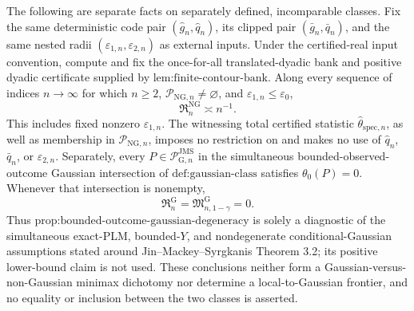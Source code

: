 The following are separate facts on separately defined, incomparable classes. Fix the same deterministic code pair \((\widehat g_n,\widehat q_n)\), its clipped pair \((\bar g_n,\bar q_n)\), and the same nested radii \((\varepsilon_{1,n},\varepsilon_{2,n})\) as external inputs. Under the certified-real input convention, compute and fix the once-for-all translated-dyadic bank and positive dyadic certificate supplied by \(\text{lem:finite-contour-bank}\). Along every sequence of indices \(n\to\infty\) for which \(n\ge2\), \(\mathcal P_{\mathrm{NG},n}\neq\varnothing\), and \(\varepsilon_{1,n}\le\varepsilon_0\),
\[
 \mathfrak R_n^{\mathrm{NG}}\asymp n^{-1}.
\]
This includes fixed nonzero \(\varepsilon_{1,n}\). The witnessing total certified statistic \(\widehat\theta_{\mathrm{spec},n}\), as well as membership in \(\mathcal P_{\mathrm{NG},n}\), imposes no restriction on and makes no use of \(\widehat q_n\), \(\bar q_n\), or \(\varepsilon_{2,n}\). Separately, every \(P\in\mathcal P_{\mathrm G,n}^{\mathrm{JMS}}\) in the simultaneous bounded-observed-outcome Gaussian intersection of \(\text{def:gaussian-class}\) satisfies \(\theta_0(P)=0\). Whenever that intersection is nonempty,
\[
 \mathfrak R_n^{\mathrm G}
 =\mathfrak M_{n,1-\gamma}^{\mathrm G}
 =0.
\]
Thus \(\text{prop:bounded-outcome-gaussian-degeneracy}\) is solely a diagnostic of the simultaneous exact-PLM, bounded-\(Y\), and nondegenerate conditional-Gaussian assumptions stated around Jin--Mackey--Syrgkanis Theorem 3.2; its positive lower-bound claim is not used. These conclusions neither form a Gaussian-versus-non-Gaussian minimax dichotomy nor determine a local-to-Gaussian frontier, and no equality or inclusion between the two classes is asserted.